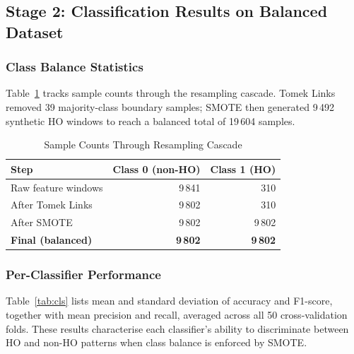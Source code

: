 \documentclass[journal]{IEEEtran}
\begin{document}
\subsection{Stage 2: Classification Results on Balanced Dataset}

\subsubsection{Class Balance Statistics}

Table~\ref{tab:balance} tracks sample counts through the resampling
cascade. Tomek Links removed 39 majority-class boundary samples; SMOTE
then generated 9\,492 synthetic HO windows to reach a balanced total of
19\,604 samples.

\begin{table}[!t]
\caption{Sample Counts Through Resampling Cascade}
\label{tab:balance}
\centering
\begin{tabular}{lrr}
\toprule
\textbf{Step} & \textbf{Class 0 (non-HO)} & \textbf{Class 1 (HO)} \\
\midrule
Raw feature windows        & 9\,841 & 310     \\
After Tomek Links          & 9\,802 & 310     \\
After SMOTE                & 9\,802 & 9\,802  \\
\midrule
\textbf{Final (balanced)}  & \textbf{9\,802} & \textbf{9\,802} \\
\bottomrule
\end{tabular}
\end{table}

\subsubsection{Per-Classifier Performance}

Table~\ref{tab:cls} lists mean and standard deviation of accuracy and
F1-score, together with mean precision and recall, averaged across all
50 cross-validation folds. These results characterise each classifier's
ability to discriminate between HO and non-HO patterns when class
balance is enforced by SMOTE.
\end{document}
